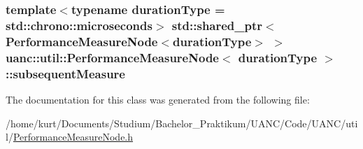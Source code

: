 \subsubsection[{\texorpdfstring{subsequent\+Measure}{subsequentMeasure}}]{\setlength{\rightskip}{0pt plus 5cm}template$<$typename duration\+Type  = std\+::chrono\+::microseconds$>$ std\+::shared\+\_\+ptr$<${\bf Performance\+Measure\+Node}$<$duration\+Type$>$ $>$ {\bf uanc\+::util\+::\+Performance\+Measure\+Node}$<$ duration\+Type $>$\+::subsequent\+Measure}\hypertarget{classuanc_1_1util_1_1_performance_measure_node_a48b59e75db03b65e2dc2dfd7bbdf05bb}{}\label{classuanc_1_1util_1_1_performance_measure_node_a48b59e75db03b65e2dc2dfd7bbdf05bb}


The documentation for this class was generated from the following file\+:\begin{DoxyCompactItemize}
\item 
/home/kurt/\+Documents/\+Studium/\+Bachelor\+\_\+\+Praktikum/\+U\+A\+N\+C/\+Code/\+U\+A\+N\+C/util/\hyperlink{_performance_measure_node_8h}{Performance\+Measure\+Node.\+h}\end{DoxyCompactItemize}
